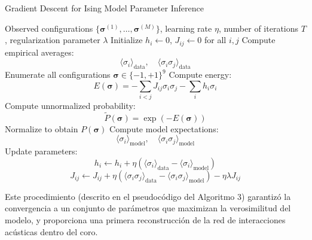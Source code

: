 \begin{algorithm}[H]
    \caption{Gradient Descent for Ising Model Parameter Inference}
    \begin{algorithmic}[1]
    \Require Observed configurations \( \{\boldsymbol{\sigma}^{(1)}, \dots, \boldsymbol{\sigma}^{(M)}\} \), learning rate \( \eta \), number of iterations \( T \), regularization parameter \( \lambda \)
    \State Initialize \( h_i \gets 0 \), \( J_{ij} \gets 0 \) for all \( i, j \)
        \State Compute empirical averages:
            \[ \langle \sigma_i \rangle_{\text{data}}, \quad \langle \sigma_i \sigma_j \rangle_{\text{data}} \]
        \State Enumerate all configurations \( \boldsymbol{\sigma} \in \{-1, +1\}^9 \)
            \State Compute energy: 
                \[ E(\boldsymbol{\sigma}) = -\sum_{i<j} J_{ij} \sigma_i \sigma_j - \sum_i h_i \sigma_i \]
            \State Compute unnormalized probability: 
                \[ \tilde{P}(\boldsymbol{\sigma}) = \exp(-E(\boldsymbol{\sigma})) \]
        \EndFor
        \State Normalize to obtain \( P(\boldsymbol{\sigma}) \)
        \State Compute model expectations:
            \[ \langle \sigma_i \rangle_{\text{model}}, \quad \langle \sigma_i \sigma_j \rangle_{\text{model}} \]
        \State Update parameters:
            \[
            h_i \gets h_i + \eta \left( \langle \sigma_i \rangle_{\text{data}} - \langle \sigma_i \rangle_{\text{model}} \right)
            \]
            \[
            J_{ij} \gets J_{ij} + \eta \left( \langle \sigma_i \sigma_j \rangle_{\text{data}} - \langle \sigma_i \sigma_j \rangle_{\text{model}} \right) - \eta \lambda J_{ij}
            \]
    \EndFor
    \end{algorithmic}
\end{algorithm}

Este procedimiento (descrito en el pseudocódigo del Algoritmo 3) garantizó la convergencia a un conjunto de 
parámetros que maximizan la verosimilitud del modelo, y 
proporciona una primera reconstrucción de la red de 
interacciones acústicas dentro del coro.
